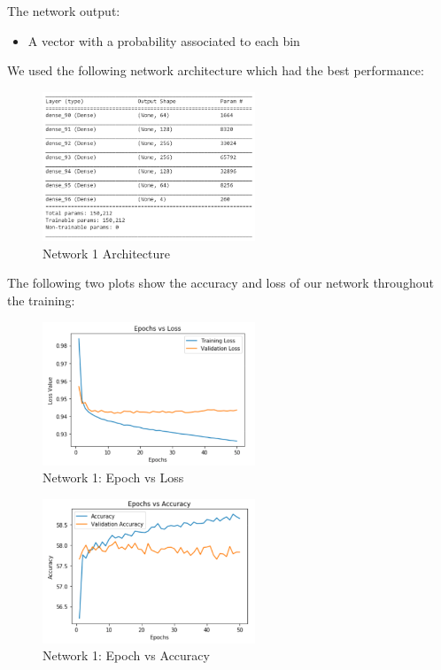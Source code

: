 \documentclass[conference]{IEEEtran}
\begin{document}
The network output:

\begin{itemize}
  \item A vector with a probability associated to each bin\\
\end{itemize}

We used the following network architecture which had the best performance:

\begin{figure}[H]
  \centering
  \captionsetup{justification=centering}
  \centering
  \includegraphics[width=2.5in]{6.png}
  \caption{Network 1 Architecture}  
  \label{1}
\end{figure}

The following two plots show the accuracy and loss of our network throughout the training:

\begin{figure}[H]
  \centering
  \captionsetup{justification=centering}
  \centering
  \includegraphics[width=2.5in]{7.png}
  \caption{Network 1: Epoch vs Loss}  
  \label{1}
\end{figure}

\begin{figure}[H]
  \centering
  \captionsetup{justification=centering}
  \centering
  \includegraphics[width=2.5in]{8.png}
  \caption{Network 1: Epoch vs Accuracy}  
  \label{1}
\end{figure}
\end{document}
